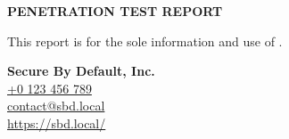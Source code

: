 \documentclass[a4paper]{article}
\begin{document}
\pagestyle{fancy}
\fancyhf{} %

\begin{titlepage}

  \vspace*{\fill}

  \begin{center}
  \end{center}

  \vfill
  
  {
    \Huge \textbf{\MakeUppercase{Penetration Test Report}}
    \vspace{1ex}
  }

  {
    \Large \textbf{}
  }

  {
    \Large \textbf{}
  }

\end{titlepage}


\fancyfoot[C]{\thepage}

{
  \vspace*{\fill}

  This report is for the sole information and use of .

  \textbf{Secure By Default, Inc.} \\
  \href{tel:+0123456789}{+0 123 456 789} \\
  \href{mailto:contact@sbd.local}{contact@sbd.local} \\
  \href{https://sbd.local/}{https://sbd.local/}
}
\end{document}
